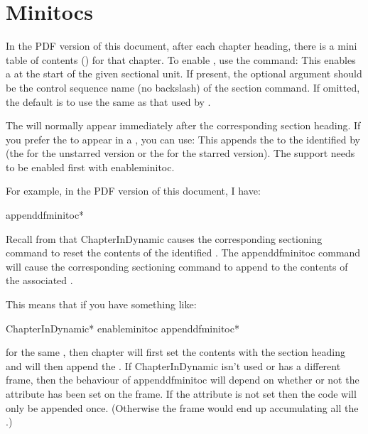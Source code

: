 \documentclass[fontsize=12pt]{scrbook}
\newcommand\thisdoc{the PDF version of this document}
\newcommand\thisdoc{this document}
\begin{document}
\section{Minitocs}\label{sec:minitocs}

In \thisdoc, after each chapter heading, there is a mini table of
contents () for that chapter.  To enable
, use the command:
This enables a  at the start of the given sectional
unit. If present, the optional argument  should
be the control sequence name (no backslash) of the section command.
If omitted, the default is to use the same as that used by
.

The  will normally appear immediately after the
corresponding section heading. If you prefer the  to
appear in a , you can use:
This appends the  to the  identified
by  (the  for the unstarred version or the
 for the starred version). The  support needs
to be enabled first with \gls{enableminitoc}.

For example, in \thisdoc, I have:
\begin{codebox}
\gls{appenddfminitoc}*
\end{codebox}

Recall from  that \gls{ChapterInDynamic}
causes the corresponding sectioning command to reset the contents of
the identified . The \gls{appenddfminitoc}
command will cause the corresponding sectioning command to append to
the contents of the associated .

This means that if you have something like: 
\begin{compactcodebox}
\gls{ChapterInDynamic}*
\gls{enableminitoc}
\gls{appenddfminitoc}*
\end{compactcodebox}
for the same  , then 
\gls{chapter} will first set the contents with
the section heading and will then append the .
If \gls{ChapterInDynamic} isn't used or has a different frame, then 
the behaviour of \gls{appenddfminitoc} will depend on whether or not
the  attribute has been set on the 
frame. If the  attribute is not set then the
 code will only be appended once. (Otherwise the frame
would end up accumulating all the .)
\end{document}
